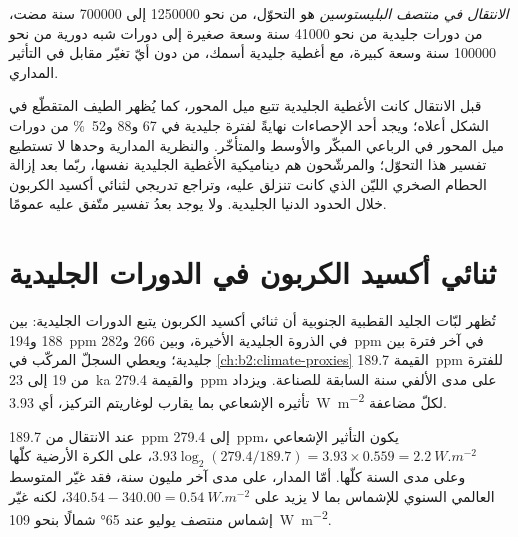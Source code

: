 \begin{definition}\label{def:b2:orbital-forcing:mpt}
\emph{الانتقال في منتصف البليستوسين} هو التحوّل، من نحو
\num{1250000} إلى \num{700000} سنة مضت، من دورات جليدية من نحو \num{41000} سنة وسعة
صغيرة إلى دورات شبه دورية من نحو \num{100000} سنة وسعة كبيرة، مع أغطية جليدية
أسمك، من دون أيّ تغيّر مقابل في التأثير المداري.
\end{definition}

قبل الانتقال كانت الأغطية الجليدية تتبع ميل المحور، كما يُظهر الطيف المتقطّع في الشكل
أعلاه؛ ويجد أحد الإحصاءات نهايةً لفترة جليدية في 67 و88 و\qty{52}{\percent} من
دورات ميل المحور في الرباعي المبكّر والأوسط والمتأخّر. والنظرية المدارية وحدها لا تستطيع تفسير هذا التحوّل؛ والمرشّحون هم ديناميكية
الأغطية الجليدية نفسها، ربّما بعد إزالة الحطام الصخري الليّن الذي كانت تنزلق عليه،
وتراجع تدريجي لثنائي أكسيد الكربون خلال الحدود الدنيا الجليدية. ولا يوجد بعدُ تفسير
متّفق عليه عمومًا.

\section{ثنائي أكسيد الكربون في الدورات الجليدية}\label{sec:b2:orbital-forcing:co2}

تُظهر لبّات الجليد القطبية الجنوبية أن ثنائي أكسيد الكربون يتبع الدورات الجليدية: بين 188
و\qty{194}{ppm} في الذروة الجليدية الأخيرة، وبين 266 و\qty{282}{ppm} في آخر فترة بين جليدية؛
ويعطي السجلّ المركّب في \cref{ch:b2:climate-proxies} القيمة \qty{189.7}{ppm} للفترة من 19 إلى
\qty{23}{ka} والقيمة \qty{279.4}{ppm} على مدى الألفي سنة السابقة للصناعة. ويزداد تأثيره الإشعاعي
بما يقارب لوغاريتم التركيز، أي \qty{3.93}{W.m^{-2}} لكلّ مضاعفة.

\begin{example}\label{ex:b2:orbital-forcing:co2}
عند الانتقال من \qty{189.7}{ppm} إلى \qty{279.4}{ppm}، يكون التأثير الإشعاعي $3.93\log_2(279.4/189.7) = 3.93 \times
0.559 = \qty{2.2}{W.m^{-2}}$، على الكرة الأرضية كلّها وعلى مدى السنة كلّها. أمّا المدار، على مدى آخر
مليون سنة، فقد غيّر المتوسط العالمي السنوي للإشماس بما لا يزيد على $340.54 - 340.00 =
\qty{0.54}{W.m^{-2}}$، لكنه غيّر إشماس منتصف يوليو عند \ang{65} شمالًا بنحو \qty{109}{W.m^{-2}}.
\end{example}

